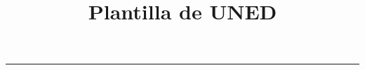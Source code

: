 \documentclass[a4paper, 12pt]{extarticle}
\title{\Huge{\vspace{-1em} Plantilla de UNED}}
\author{}
\date{}
\begin{document}
	\maketitle

	\vspace*{-4em}
		
	\lipsum

	
	\noindent\rule{\linewidth}{0.4pt}
	\doclicenseThis
	 
	 
	 
	 
	 
	 
	 
	 
	  	
 	
 	
 	
 	
 	
\end{document}
